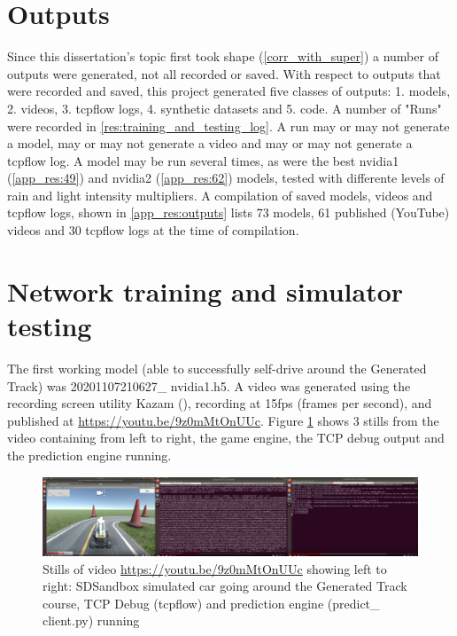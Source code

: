 
\section{Outputs}
Since this dissertation's topic first took shape (\ref{corr_with_super}) a number of outputs were generated, not all recorded or saved. With respect to outputs that were recorded and saved, this project generated five classes of outputs: 1. models, 2. videos, 3. tcpflow logs, 4. synthetic datasets and 5. code. A number of "Runs" were recorded in \ref{res:training_and_testing_log}. A run may or may not generate a model, may or may not generate a video and may or may not generate a tcpflow log. A model may be run several times, as were the best nvidia1 (\ref{app_res:49}) and nvidia2 (\ref{app_res:62}) models, tested with differente levels of rain and light intensity multipliers.
A compilation of saved models, videos and tcpflow logs, shown in \ref{app_res:outputs} lists 73 models, 61 published (YouTube) videos and 30 tcpflow logs at the time of compilation.





\section{Network training and simulator testing}
\label{results:net-training} 
The first working model (able to successfully self-drive around the Generated Track) was 20201107210627\_ nvidia1.h5. A video was generated using the recording screen utility Kazam (\cite{Kazam2020}), recording at 15fps (frames per second), and published at  \href{https://youtu.be/9z0mMtOnUUc}{https://youtu.be/9z0mMtOnUUc}. Figure \ref{fig:SimTCPPred}
shows 3 stills from the video containing from left to right, the game engine, the TCP debug output and the prediction engine running.

\begin{figure}[h!]
\centering
\includegraphics[width=\textwidth]{Figures/SimTCPPred.png}
\caption{Stills of video \href{https://youtu.be/9z0mMtOnUUc}{https://youtu.be/9z0mMtOnUUc} showing left to right: SDSandbox simulated car going around the Generated Track course, TCP Debug (tcpflow) and prediction engine (predict\_ client.py) running}
\label{fig:SimTCPPred}
\end{figure}

